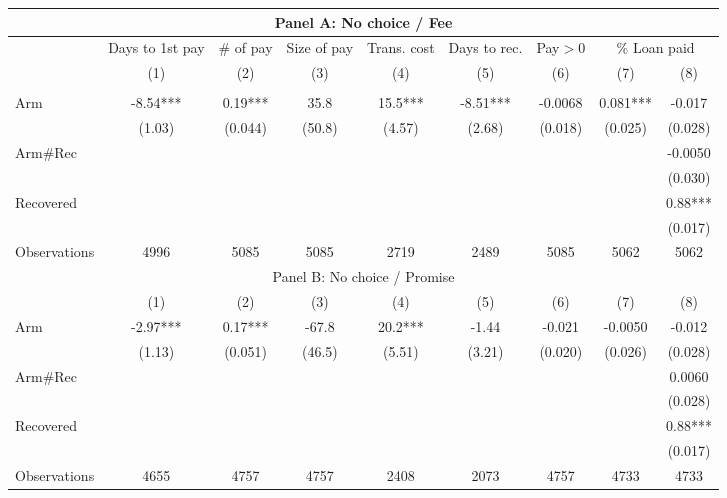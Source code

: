 \begin{tabular}{lcccccccc}
\toprule
\multicolumn{9}{c}{Panel A: No choice / Fee} \\
\midrule
\midrule
      & Days to 1st pay & \# of pay & Size of pay & Trans. cost & Days to rec. &  Pay$>$0 & \multicolumn{2}{c}{\% Loan paid} \\
\midrule
      & (1)   & (2)   & (3)   & (4)   & (5)   & (6)   & (7)   & (8) \\
\midrule
\midrule
      &       &       &       &       &       &       &       &  \\
Arm   & -8.54*** & 0.19*** & 35.8  & 15.5*** & -8.51*** & -0.0068 & 0.081*** & -0.017 \\
      & (1.03) & (0.044) & (50.8) & (4.57) & (2.68) & (0.018) & (0.025) & (0.028) \\
Arm\#Rec &       &       &       &       &       &       &       & -0.0050 \\
      &       &       &       &       &       &       &       & (0.030) \\
Recovered &       &       &       &       &       &       &       & 0.88*** \\
      &       &       &       &       &       &       &       & (0.017) \\
\midrule
Observations & 4996  & 5085  & 5085  & 2719  & 2489  & 5085  & 5062  & 5062 \\
\midrule
\multicolumn{9}{c}{Panel B: No choice / Promise} \\
\midrule
\midrule
      & (1)   & (2)   & (3)   & (4)   & (5)   & (6)   & (7)   & (8) \\
\midrule
\midrule
Arm   & -2.97*** & 0.17*** & -67.8 & 20.2*** & -1.44 & -0.021 & -0.0050 & -0.012 \\
      & (1.13) & (0.051) & (46.5) & (5.51) & (3.21) & (0.020) & (0.026) & (0.028) \\
Arm\#Rec &       &       &       &       &       &       &       & 0.0060 \\
      &       &       &       &       &       &       &       & (0.028) \\
Recovered &       &       &       &       &       &       &       & 0.88*** \\
      &       &       &       &       &       &       &       & (0.017) \\
\midrule
Observations & 4655  & 4757  & 4757  & 2408  & 2073  & 4757  & 4733  & 4733 \\
\midrule

\end{tabular}
